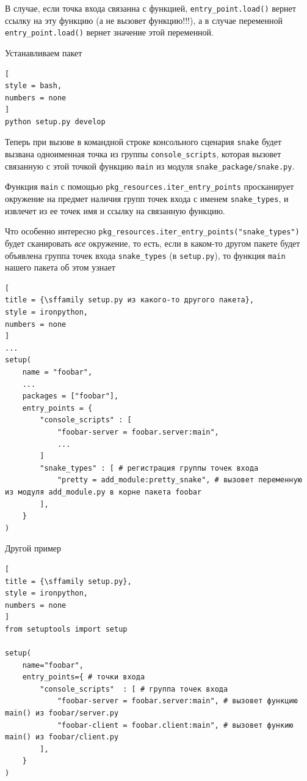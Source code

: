 \documentclass[%
	11pt,
	a4paper,
	utf8,
		]{article}
\begin{document}
В случае, если точка входа связанна с функцией, \texttt{entry\_point.load()} вернет ссылку на эту функцию (а не вызовет функцию!!!), а в случае переменной \texttt{entry\_point.load()} вернет значение этой переменной.

Устанавливаем пакет
\begin{lstlisting}[
style = bash,
numbers = none	
]
python setup.py develop
\end{lstlisting}

Теперь при вызове в командной строке консольного сценария \texttt{snake} будет вызвана одноименная точка из группы \texttt{console\_scripts}, которая вызовет связанную с этой точкой функцию \texttt{main} из модуля \texttt{snake\_package/snake.py}.

Функция \texttt{main} с помощью \texttt{pkg\_resources.iter\_entry\_points} просканирует окружение на предмет наличия групп точек входа с именем \texttt{snake\_types}, и извлечет из ее точек имя и ссылку на связанную функцию.

Что особенно интересно \texttt{pkg\_resources.iter\_entry\_points("snake\_types")} будет сканировать \emph{все} окружение, то есть, если в каком-то другом пакете будет объявлена группа точек входа \texttt{snake\_types} (в \texttt{setup.py}), то функция \texttt{main} нашего пакета об этом узнает
\begin{lstlisting}[
title = {\sffamily setup.py из какого-то другого пакета},
style = ironpython,
numbers = none	
]
...
setup(
    name = "foobar",
    ...
    packages = ["foobar"],
    entry_points = {
        "console_scripts" : [
            "foobar-server = foobar.server:main",
            ...
        ]
        "snake_types" : [ # регистрация группы точек входа
            "pretty = add_module:pretty_snake", # вызовет переменную из модуля add_module.py в корне пакета foobar
        ],
    }
)
\end{lstlisting}



Другой пример
\begin{lstlisting}[
title = {\sffamily setup.py},
style = ironpython,
numbers = none
]
from setuptools import setup

setup(
    name="foobar",
    entry_points={ # точки входа
        "console_scripts"  : [ # группа точек входа
            "foobar-server = foobar.server:main", # вызовет функцию main() из foobar/server.py
            "foobar-client = foobar.client:main", # вызовет функию main() из foobar/client.py
        ],
    }
)
\end{lstlisting}
\end{document}
